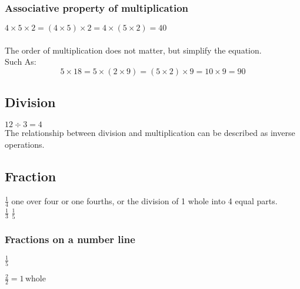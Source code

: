 \documentclass[10pt,a4paper]{article}
\begin{document}
\subsubsection{Associative property of multiplication}
$4 \times 5 \times 2 = \left(4 \times 5\right) \times 2 = 4 \times \left(5 \times 2\right) = 40$\\\\
The order of multiplication does not matter, but simplify the equation.\\
Such As:
$$5 \times 18 = 5 \times \left(2 \times 9\right) = \left(5 \times 2\right) \times 9 = 10 \times 9 = 90$$

\subsection{Division}
$12 \div 3 = 4$\\

The relationship between division and multiplication can be described as inverse operations. 

\subsection{Fraction}
$\frac{1}{4}$ one over four or one fourths, or the division of 1 whole into 4 equal parts.\\

$\frac{1}{3}$ $\frac{1}{5}$\\

\subsubsection{Fractions on a number line}

$\frac{1}{5}$\\


$\frac{2}{2} = 1\, \text{whole}$
\end{document}
